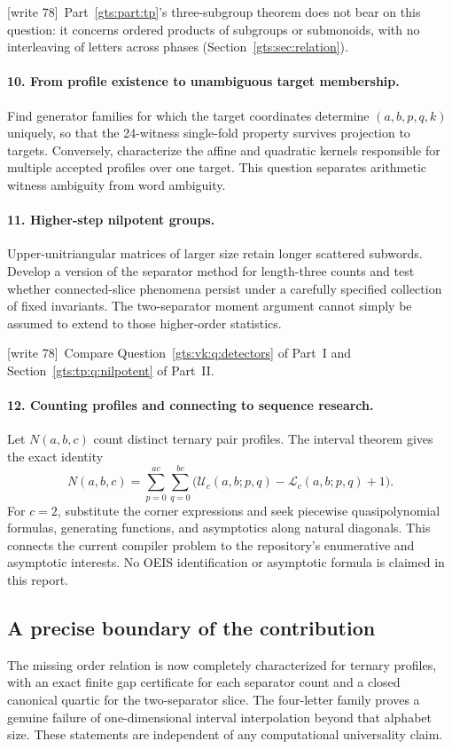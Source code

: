 \documentclass[11pt,letterpaper]{article}
\theoremstyle{definition}
\theoremstyle{remark}
\newcommand{\low}{\mathcal L}
\newcommand{\up}{\mathcal U}
\newcommand{\wtagb}{\textup{[write 78]}}
\begin{document}
\wtagb\ Part~\ref{gts:part:tp}'s three-subgroup theorem does not bear on this question: it concerns ordered products of subgroups or submonoids, with no interleaving of letters across phases (Section~\ref{gts:sec:relation}).

\paragraph{10. From profile existence to unambiguous target membership.}
Find generator families for which the target coordinates determine $(a,b,p,q,k)$ uniquely, so that the 24-witness single-fold property survives projection to targets. Conversely, characterize the affine and quadratic kernels responsible for multiple accepted profiles over one target. This question separates arithmetic witness ambiguity from word ambiguity.

\paragraph{11. Higher-step nilpotent groups.}
Upper-unitriangular matrices of larger size retain longer scattered subwords. Develop a version of the separator method for length-three counts and test whether connected-slice phenomena persist under a carefully specified collection of fixed invariants. The two-separator moment argument cannot simply be assumed to extend to those higher-order statistics.

\wtagb\ Compare Question~\ref{gts:vk:q:detectors} of Part~I and Section~\ref{gts:tp:q:nilpotent} of Part~II.

\paragraph{12. Counting profiles and connecting to sequence research.}
Let $N(a,b,c)$ count distinct ternary pair profiles. The interval theorem gives the exact identity
\[
 N(a,b,c)=\sum_{p=0}^{ac}\sum_{q=0}^{bc}
       \bigl(\up_c(a,b;p,q)-\low_c(a,b;p,q)+1\bigr).
\]
For $c=2$, substitute the corner expressions and seek piecewise quasipolynomial formulas, generating functions, and asymptotics along natural diagonals. This connects the current compiler problem to the repository's enumerative and asymptotic interests. No OEIS identification or asymptotic formula is claimed in this report.

\subsection{A precise boundary of the contribution}
The missing order relation is now completely characterized for ternary profiles, with an exact finite gap certificate for each separator count and a closed canonical quartic for the two-separator slice. The four-letter family proves a genuine failure of one-dimensional interval interpolation beyond that alphabet size. These statements are independent of any computational universality claim.
\end{document}
